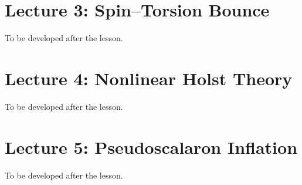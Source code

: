 \documentclass[11pt,a4paper]{article}
\begin{document}
\section{Lecture 3: Spin--Torsion Bounce}
To be developed after the lesson.
\section{Lecture 4: Nonlinear Holst Theory}
To be developed after the lesson.
\section{Lecture 5: Pseudoscalaron Inflation}
To be developed after the lesson.
\end{document}
